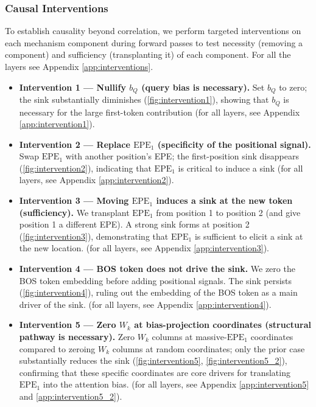 \documentclass[11pt]{article}
\newif\ifResolvedcomments
\newcommand{\Resolved}[1]{\ifResolvedcomments\textcolor{green}{[Resolved: #1]}\fi}
\begin{document}
\subsubsection{Causal Interventions}
\label{sec:interventions}
To establish causality beyond correlation, we perform targeted 
interventions on each mechanism component during forward passes to test necessity (removing a component) and sufficiency (transplanting it) of each component. For all the layers see Appendix \ref{app:interventions}.

\Resolved{Now to the annoying part - we need to somehow say that this is robust and happens in many layers, so say we add more layers in the appendix and do this, it's ok if it's not as robust this experiment but people expect this info to be present. Please go after this over all the paper and think where else we need to add more experiments to the appendix.}


\begin{itemize}[leftmargin=*]
    \item \textbf{Intervention 1 — Nullify $b_Q$ (query bias is necessary).} Set $b_Q$ to zero; the sink substantially diminishes (\cref{fig:intervention1}), showing that $b_Q$ is necessary for the large first-token contribution (for all layers, see Appendix \ref{app:intervention1}).
    \item \textbf{Intervention 2 — Replace $\mathrm{EPE}_1$ (specificity of the positional signal).} Swap $\mathrm{EPE}_1$ with another position’s EPE; the first-position sink disappears (\cref{fig:intervention2}), indicating that $\mathrm{EPE}_1$ is critical to induce a sink (for all layers, see Appendix \ref{app:intervention2}).
    \item \textbf{Intervention 3 — Moving $\mathrm{EPE}_1$ induces a sink at the new token (sufficiency).} We transplant $\mathrm{EPE}_1$ from position 1 to position 2 (and give position 1 a different EPE). A strong sink forms at position 2 (\cref{fig:intervention3}), demonstrating that $\mathrm{EPE}_1$ is sufficient to elicit a sink at the new location. (for all layers, see Appendix \ref{app:intervention3}).
    \item \textbf{Intervention 4 — BOS token does not drive the sink.} We zero the BOS token embedding before adding positional signals. The sink persists (\cref{fig:intervention4}), ruling out the embedding of the BOS token as a main driver of the sink. (for all layers, see Appendix \ref{app:intervention4}).
    \item \textbf{Intervention 5 — Zero $W_k$ at bias-projection coordinates (structural pathway is necessary).} Zero $W_k$ columns at massive-$\mathrm{EPE}_1$ coordinates compared to zeroing $W_k$ columns at random coordinates; only the prior case substantially reduces the sink (\cref{fig:intervention5}, \cref{fig:intervention5_2}), confirming that these specific coordinates are core drivers for translating $\mathrm{EPE}_1$ into the attention bias. (for all layers, see Appendix \ref{app:intervention5} and \ref{app:intervention5_2}).
\end{itemize}
\end{document}

